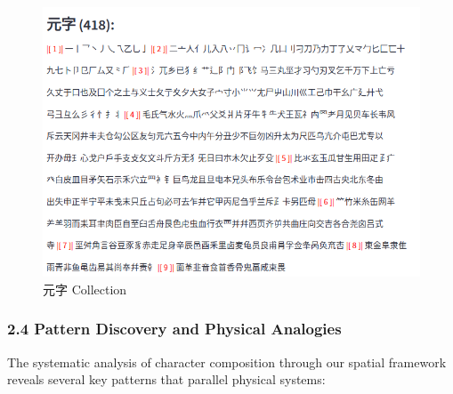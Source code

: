 \documentclass[
  11pt,
  letterpaper,
]{article}
\begin{document}
\begin{figure}
\centering
\includegraphics{./images/app_zi-elements.png}
\caption{元字 Collection}
\end{figure}

\subsubsection{2.4 Pattern Discovery and Physical
Analogies}\label{pattern-discovery-and-physical-analogies}

The systematic analysis of character composition through our spatial
framework reveals several key patterns that parallel physical systems:
\end{document}
